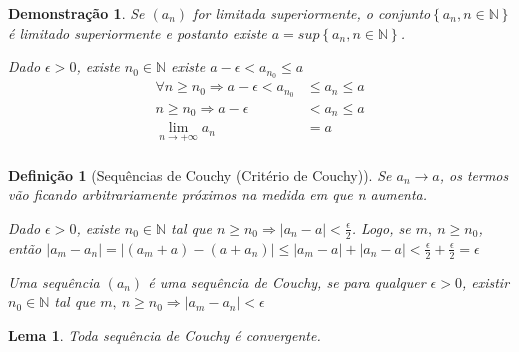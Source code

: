 \documentclass[12pt,openany]{book}
\newtheorem{lemma}{Lema}[section]
\newtheorem{definition}{Definição}[section]
\newtheorem{demonstration}{Demonstração}
\begin{document}
\begin{demonstration}
Se $ (a_n) $ for limitada superiormente, o conjunto$\left\{a_n, n \in \mathds{N}\right\}$ é limitado superiormente e postanto existe $ a = sup \left\{a_n, n \in \mathds{N}\right\}$.

Dado $\epsilon > 0$, existe $n_0 \in \mathds{N}$ existe $a - \epsilon < a_{n_0} \leq a$
\begin{align*}
\forall n \geq n_0 \Rightarrow a - \epsilon < a_{n_0} &\leq a_n \leq a \\
n \geq n_0 \Rightarrow a - \epsilon &< a_n \leq a \\
\lim_{n \rightarrow +\infty} a_n &= a \\
\end{align*}
\end{demonstration}

\begin{definition}[Sequências de Couchy (Critério de Couchy)]
Se $a_n \rightarrow a$, os termos vão ficando arbitrariamente próximos na medida em que n aumenta. 

Dado $\epsilon > 0 $, existe $n_0 \in \mathds{N}$ tal que $n \geq n_0 \Rightarrow |a_n - a| < \frac{\epsilon}{2}$. Logo, se $m, \ n \geq n_0$, então $|a_m - a_n| = |(a_m + a) - (a + a_n)| \leq |a_m - a| + |a_n -a| < \displaystyle{\frac{\epsilon}{2}+\frac{\epsilon}{2}} = \epsilon$

Uma sequência $(a_n)$ é uma sequência de Couchy, se para qualquer $\epsilon > 0$, existir $n_0 \in \mathds{N}$ tal que $m, \ n \geq n_0 \Rightarrow |a_m - a_n| < \epsilon$
\end{definition}

\begin{lemma}
Toda sequência de Couchy é convergente. 
\end{lemma}
\end{document}
